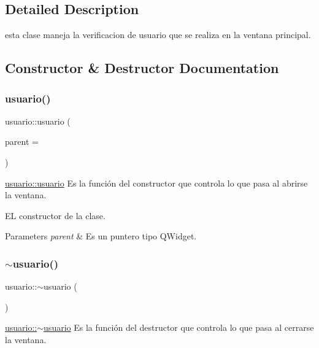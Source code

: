 \subsection{Detailed Description}
esta clase maneja la verificacion de usuario que se realiza en la ventana principal. 

\subsection{Constructor \& Destructor Documentation}
\mbox{\label{classusuario_a34821186e90424c9105221fb931e9ca0}} 
\subsubsection{\texorpdfstring{usuario()}{usuario()}}
{\footnotesize\ttfamily usuario\+::usuario (\begin{DoxyParamCaption}\item[{Q\+Widget $\ast$}]{parent = {} }\end{DoxyParamCaption})\hspace{0.3cm}{\ttfamily [explicit]}}



\hyperlink{classusuario_a34821186e90424c9105221fb931e9ca0}{usuario\+::usuario} Es la función del constructor que controla lo que pasa al abrirse la ventana. 

EL constructor de la clase.


\begin{DoxyParams}{Parameters}
{\em parent} & Es un puntero tipo Q\+Widget. \\
\hline
\end{DoxyParams}
\mbox{\label{classusuario_aa70d0ad5fba6586c37b429b1806ff672}} 
\subsubsection{\texorpdfstring{$\sim$usuario()}{~usuario()}}
{\footnotesize\ttfamily usuario\+::$\sim$usuario (\begin{DoxyParamCaption}{ }\end{DoxyParamCaption})}



\hyperlink{classusuario_aa70d0ad5fba6586c37b429b1806ff672}{usuario\+::$\sim$usuario} Es la función del destructor que controla lo que pasa al cerrarse la ventana. 


